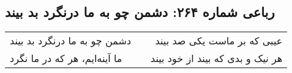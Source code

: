 \begin{center}
\section*{رباعی شماره ۲۶۴: دشمن چو به ما درنگرد بد بیند}
\label{sec:sh264}
\begin{longtable}{l p{0.5cm} r}
دشمن چو به ما درنگرد بد بیند
&&
عیبی که بر ماست یکی صد بیند
\\
ما آینه‌ایم، هر که در ما نگرد
&&
هر نیک و بدی که بیند از خود بیند
\\
\end{longtable}
\end{center}
